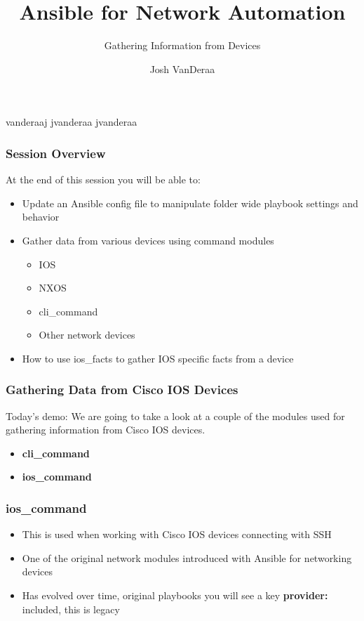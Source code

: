 \documentclass{beamer}
\title{Ansible for Network Automation}
\subtitle{Gathering Information from Devices}
\date{}
\author{Josh VanDeraa}
\begin{document}
\begin{frame}
  \maketitle
  \footnotesize
  \faTwitter vanderaaj \hfill \faGithub jvanderaa \hfill \faSlack jvanderaa
\end{frame}

\begin{frame}
  \frametitle{Session Overview}
  At the end of this session you will be able to:
  \begin{itemize}
    \item <2-> Update an Ansible config file to manipulate folder wide playbook settings and behavior
    \item <3-> Gather data from various devices using command modules
      \begin{itemize}
        \item IOS
        \item NXOS
        \item cli\_command
        \item Other network devices
      \end{itemize}
    \item <4-> How to use ios\_facts to gather IOS specific facts from a device
  \end{itemize}
\end{frame}

\begin{frame}
    \frametitle{Gathering Data from Cisco IOS Devices}
    Today's demo: We are going to take a look at a couple of the modules used
    for gathering information from Cisco IOS devices. 
    \begin{itemize}
        \item<2-> \textbf{cli\_command}
        \item<3-> \textbf{ios\_command}
    \end{itemize}
\end{frame}

\begin{frame}
    \frametitle{ios\_command}
    \begin{itemize}
      \item <1-> This is used when working with Cisco IOS devices connecting with SSH
      \item <2-> One of the original network modules introduced with Ansible for networking devices
      \item <3-> Has evolved over time, original playbooks you will see a key \textbf{provider:} included, this is legacy
    \end{itemize}
\end{frame}
\end{document}
